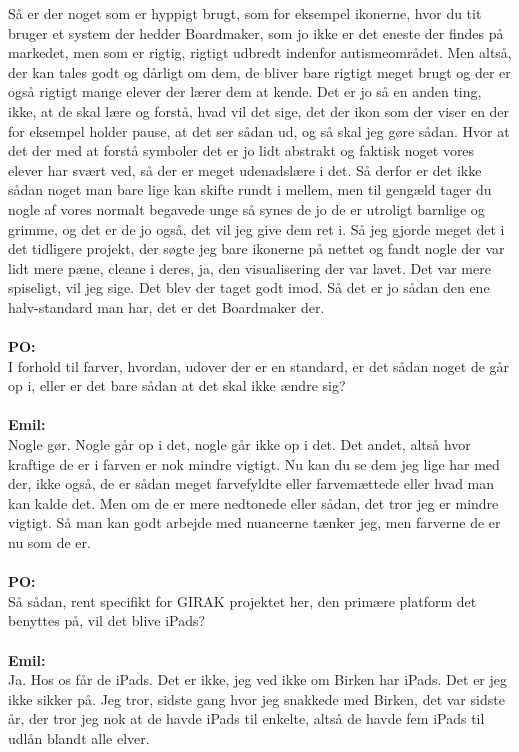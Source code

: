 Så er der noget som er hyppigt brugt, som for eksempel ikonerne, hvor du tit bruger et system der hedder Boardmaker, som jo ikke er det eneste der findes på markedet, men som er rigtig, rigtigt udbredt indenfor autismeområdet.
Men altså, der kan tales godt og dårligt om dem, de bliver bare rigtigt meget brugt og der er også rigtigt mange elever der lærer dem at kende.
Det er jo så en anden ting, ikke, at de skal lære og forstå, hvad vil det sige, det der ikon som der viser en der for eksempel holder pause, at det ser sådan ud, og så skal jeg gøre sådan.
Hvor at det der med at forstå symboler det er jo lidt abstrakt og faktisk noget vores elever har svært ved, så der er meget udenadslære i det.
Så derfor er det ikke sådan noget man bare lige kan skifte rundt i mellem, men til gengæld tager du nogle af vores normalt begavede unge så synes de jo de er utroligt barnlige og grimme, og det er de jo også, det vil jeg give dem ret i.
Så jeg gjorde meget det i det tidligere projekt, der søgte jeg bare ikonerne på nettet og fandt nogle der var lidt mere pæne, cleane i deres, ja, den visualisering der var lavet. 
Det var mere spiseligt, vil jeg sige.
Det blev der taget godt imod. 
Så det er jo sådan den ene halv-standard man har, det er det Boardmaker der. 
\\\\
\textbf{PO:}\\
I forhold til farver, hvordan, udover der er en standard, er det sådan noget de går op i, eller er det bare sådan at det skal ikke ændre sig?
\\\\
\textbf{Emil:}\\
Nogle gør.
Nogle går op i det, nogle går ikke op i det.
Det andet, altså hvor kraftige de er i farven er nok mindre vigtigt.
Nu kan du se dem jeg lige har med der, ikke også, de er sådan meget farvefyldte eller farvemættede eller hvad man kan kalde det.
Men om de er mere nedtonede eller sådan, det tror jeg er mindre vigtigt.  
Så man kan godt arbejde med nuancerne tænker jeg, men farverne de er nu som de er.
\\\\
\textbf{PO:}\\
Så sådan, rent specifikt for GIRAK projektet her, den primære platform det benyttes på, vil det blive iPads?
\\\\
\textbf{Emil:}\\
Ja.
Hos os får de iPads. 
Det er ikke, jeg ved ikke om Birken har iPads.
Det er jeg ikke sikker på.
Jeg tror, sidste gang hvor jeg snakkede med Birken, det var sidste år, der tror jeg nok at de havde iPads til enkelte, altså de havde fem iPads til udlån blandt alle elver.

